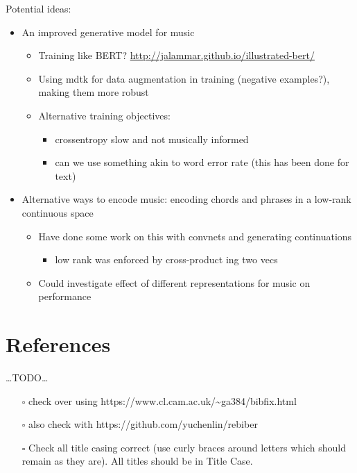 \documentclass[12pt,a4paper,]{report}
\providecommand{\tightlist}{%
  \setlength{\itemsep}{0pt}\setlength{\parskip}{0pt}}
\begin{document}
Potential ideas:

\begin{itemize}
\tightlist
\item
  An improved generative model for music

  \begin{itemize}
  \tightlist
  \item
    Training like BERT?
    \url{http://jalammar.github.io/illustrated-bert/}
  \item
    Using mdtk for data augmentation in training (negative examples?),
    making them more robust
  \item
    Alternative training objectives:

    \begin{itemize}
    \tightlist
    \item
      crossentropy slow and not musically informed
    \item
      can we use something akin to word error rate (this has been done
      for text)
    \end{itemize}
  \end{itemize}
\item
  Alternative ways to encode music: encoding chords and phrases in a
  low-rank continuous space

  \begin{itemize}
  \tightlist
  \item
    Have done some work on this with convnets and generating
    continuations

    \begin{itemize}
    \tightlist
    \item
      low rank was enforced by cross-product ing two vecs
    \end{itemize}
  \item
    Could investigate effect of different representations for music on
    performance
  \end{itemize}
\end{itemize}

\footnotesize
\singlespacing
\setlength{\parindent}{0in}

\hypertarget{references}{%
\chapter{References}\label{references}}

\ldots TODO\ldots{}

\begin{itemize}
\tightlist
\item[$\square$]
  check over using
  https://www.cl.cam.ac.uk/\textasciitilde ga384/bibfix.html
\item[$\square$]
  also check with https://github.com/yuchenlin/rebiber
\item[$\square$]
  Check all title casing correct (use curly braces around letters which
  should remain as they are). All titles should be in Title Case.
\end{itemize}
\end{document}
